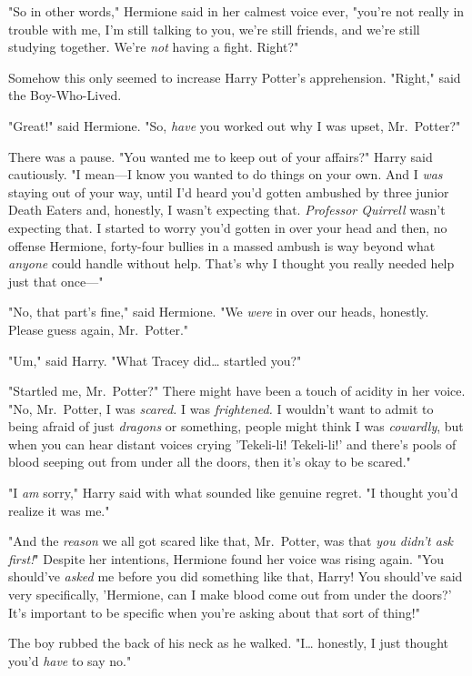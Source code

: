"So in other words," Hermione said in her calmest voice ever, "you're not 
really in trouble with me, I'm still talking to you, we're still friends, and 
we're still studying together. We're \emph{not} having a fight. Right?"

Somehow this only seemed to increase Harry Potter's apprehension. "Right," said 
the Boy-Who-Lived.

"Great!" said Hermione. "So, \emph{have} you worked out why I was upset, 
Mr.~Potter?"

There was a pause. "You wanted me to keep out of your affairs?" Harry said 
cautiously. "I mean---I know you wanted to do things on your own. And I 
\emph{was} staying out of your way, until I'd heard you'd gotten ambushed by 
three junior Death Eaters and, honestly, I wasn't expecting that. 
\emph{Professor Quirrell} wasn't expecting that. I started to worry you'd 
gotten in over your head and then, no offense Hermione, forty-four bullies in a 
massed ambush is way beyond what \emph{anyone} could handle without help. 
That's why I thought you really needed help just that once---"

"No, that part's fine," said Hermione. "We \emph{were} in over our heads, 
honestly. Please guess again, Mr.~Potter."

"Um," said Harry. "What Tracey did{\ldots} startled you?"

"Startled me, Mr.~Potter?" There might have been a touch of acidity in her 
voice. "No, Mr.~Potter, I was \emph{scared.} I was \emph{frightened.} I 
wouldn't want to admit to being afraid of just \emph{dragons} or something, 
people might think I was \emph{cowardly}, but when you can hear distant voices 
crying 'Tekeli-li! Tekeli-li!' and there's pools of blood seeping out from 
under all the doors, then it's okay to be scared."

"I \emph{am} sorry," Harry said with what sounded like genuine regret. "I 
thought you'd realize it was me."

"And the \emph{reason} we all got scared like that, Mr.~Potter, was that 
\emph{you didn't ask first!}" Despite her intentions, Hermione found her voice 
was rising again. "You should've \emph{asked} me before you did something like 
that, Harry! You should've said very specifically, 'Hermione, can I make blood 
come out from under the doors?' It's important to be specific when you're 
asking about that sort of thing!"

The boy rubbed the back of his neck as he walked. "I{\ldots} honestly, I just 
thought you'd \emph{have} to say no."

